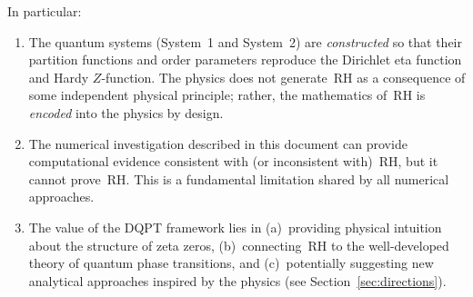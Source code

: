 In particular:
\begin{enumerate}
  \item The quantum systems (System~1 and System~2) are \emph{constructed} so that
        their partition functions and order parameters reproduce the Dirichlet eta
        function and Hardy $Z$-function. The physics does not generate~RH as a
        consequence of some independent physical principle; rather, the mathematics
        of~RH is \emph{encoded} into the physics by design.
  \item The numerical investigation described in this document can provide computational
        evidence consistent with (or inconsistent with)~RH, but it cannot prove~RH.
        This is a fundamental limitation shared by all numerical approaches.
  \item The value of the DQPT framework lies in (a)~providing physical intuition about
        the structure of zeta zeros, (b)~connecting~RH to the well-developed theory of
        quantum phase transitions, and (c)~potentially suggesting new analytical
        approaches inspired by the physics (see Section~\ref{sec:directions}).
\end{enumerate}
